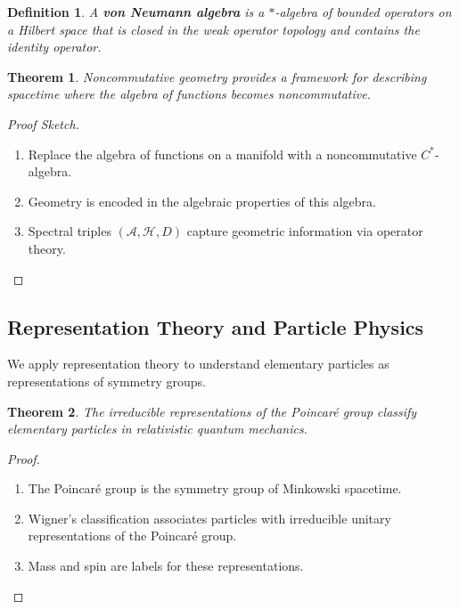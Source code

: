 \documentclass[12pt]{article}
\newtheorem{definition}{Definition}[section]
\newtheorem{theorem}{Theorem}[section]
\begin{document}
\begin{definition}
A \textbf{von Neumann algebra} is a $*$-algebra of bounded operators on a Hilbert space that is closed in the weak operator topology and contains the identity operator.
\end{definition}

\begin{theorem}
Noncommutative geometry provides a framework for describing spacetime where the algebra of functions becomes noncommutative.
\end{theorem}

\begin{proof}[Proof Sketch]
\leavevmode
\begin{enumerate}[label=\arabic*.]
    \item Replace the algebra of functions on a manifold with a noncommutative $C^*$-algebra.
    \item Geometry is encoded in the algebraic properties of this algebra.
    \item Spectral triples $(\mathcal{A}, \mathcal{H}, D)$ capture geometric information via operator theory.
\end{enumerate}
\end{proof}

\subsection{Representation Theory and Particle Physics}

We apply representation theory to understand elementary particles as representations of symmetry groups.

\begin{theorem}
The irreducible representations of the Poincaré group classify elementary particles in relativistic quantum mechanics.
\end{theorem}

\begin{proof}
\leavevmode
\begin{enumerate}[label=\arabic*.]
    \item The Poincaré group is the symmetry group of Minkowski spacetime.
    \item Wigner's classification associates particles with irreducible unitary representations of the Poincaré group.
    \item Mass and spin are labels for these representations.
\end{enumerate}
\end{proof}
\end{document}
